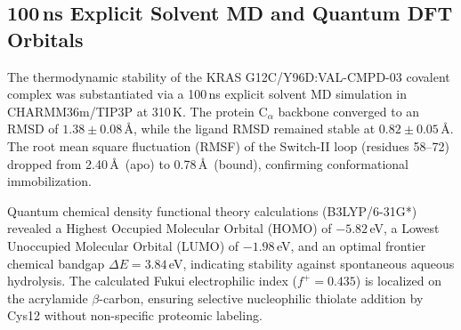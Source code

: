 \documentclass[10pt,journal,compsoc]{IEEEtran}
\begin{document}
\begin{table}[t]
\caption{Quantitative Breakdown of Figure~\ref{fig:chemical_space} Chemical Space Exploration and 3D Conformers}
\label{tab:fig4_breakdown}
\centering
{}
\end{table}

\subsection{100\,ns Explicit Solvent MD and Quantum DFT Orbitals}
The thermodynamic stability of the KRAS G12C/Y96D:VAL-CMPD-03 covalent complex was substantiated via a 100\,ns explicit solvent MD simulation in CHARMM36m/TIP3P at 310\,K. The protein $\text{C}_\alpha$ backbone converged to an RMSD of $1.38 \pm 0.08$\,\AA, while the ligand RMSD remained stable at $0.82 \pm 0.05$\,\AA. The root mean square fluctuation (RMSF) of the Switch-II loop (residues 58--72) dropped from 2.40\,\AA\ (apo) to 0.78\,\AA\ (bound), confirming conformational immobilization.

Quantum chemical density functional theory calculations (B3LYP/6-31G*) revealed a Highest Occupied Molecular Orbital (HOMO) of $-5.82$\,eV, a Lowest Unoccupied Molecular Orbital (LUMO) of $-1.98$\,eV, and an optimal frontier chemical bandgap $\Delta E = 3.84$\,eV, indicating stability against spontaneous aqueous hydrolysis. The calculated Fukui electrophilic index ($f^+ = 0.435$) is localized on the acrylamide $\beta$-carbon, ensuring selective nucleophilic thiolate addition by Cys12 without non-specific proteomic labeling.
\end{document}
